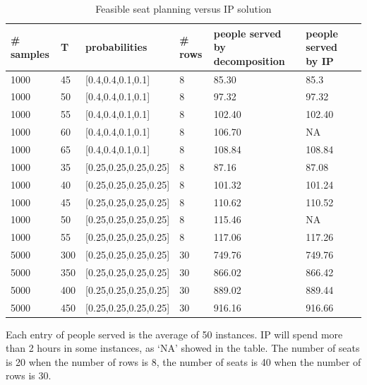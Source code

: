 \begin{table}[ht]
    \caption{Feasible seat planning versus IP solution}
    \begin{tabular}{|l|l|l|l|l|l|l|}
    \hline
    \# samples & T & probabilities & \# rows & people served by decomposition & people served by IP \\
    \hline
    1000  & 45  & [0.4,0.4,0.1,0.1] & 8 & 85.30 & 85.3 \\
    1000  & 50  & [0.4,0.4,0.1,0.1] & 8 & 97.32 & 97.32 \\
    1000  & 55  & [0.4,0.4,0.1,0.1] & 8 & 102.40 & 102.40  \\ %
    1000  & 60  & [0.4,0.4,0.1,0.1] & 8 & 106.70 & NA  \\
    1000  & 65  & [0.4,0.4,0.1,0.1] & 8 & 108.84 & 108.84 \\
    \hline
    1000  & 35  & [0.25,0.25,0.25,0.25] & 8 & 87.16 & 87.08 \\
    1000  & 40  & [0.25,0.25,0.25,0.25] & 8 & 101.32 & 101.24 \\
    1000  & 45  & [0.25,0.25,0.25,0.25] & 8 & 110.62 & 110.52 \\
    1000  & 50  & [0.25,0.25,0.25,0.25] & 8 & 115.46 & NA \\
    1000  & 55  & [0.25,0.25,0.25,0.25] & 8 & 117.06 & 117.26 \\
    \hline
    5000  & 300  & [0.25,0.25,0.25,0.25] & 30 & 749.76 & 749.76 \\
    5000  & 350  & [0.25,0.25,0.25,0.25] & 30 & 866.02 & 866.42 \\
    5000  & 400  & [0.25,0.25,0.25,0.25] & 30 & 889.02 & 889.44 \\
    5000  & 450  & [0.25,0.25,0.25,0.25] & 30 & 916.16 & 916.66 \\
    \hline
    \end{tabular}
\end{table}

Each entry of people served is the average of 50 instances.
IP will spend more than 2 hours in some instances, as `NA' showed in the table.
The number of seats is 20 when the number of rows is 8, the number of seats is 40 when the number of rows is 30.



